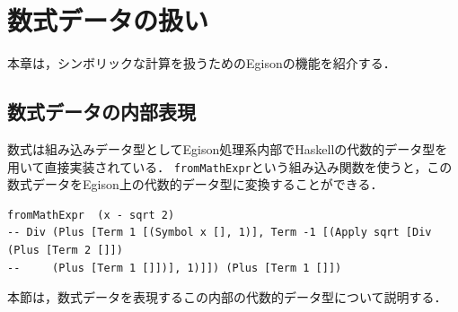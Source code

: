 \chapter{数式データの扱い}\label{mexpr}

本章は，シンボリックな計算を扱うためのEgisonの機能を紹介する．

\section{数式データの内部表現}\label{mexpr-expr}

数式は組み込みデータ型としてEgison処理系内部でHaskellの代数的データ型を用いて直接実装されている．
\lstinline{fromMathExpr}という組み込み関数を使うと，この数式データをEgison上の代数的データ型に変換することができる．
\begin{lstlisting}[language=egison,numbers=none]
fromMathExpr  (x - sqrt 2)
-- Div (Plus [Term 1 [(Symbol x [], 1)], Term -1 [(Apply sqrt [Div (Plus [Term 2 []])
--     (Plus [Term 1 []])], 1)]]) (Plus [Term 1 []])
\end{lstlisting}
本節は，数式データを表現するこの内部の代数的データ型について説明する．

